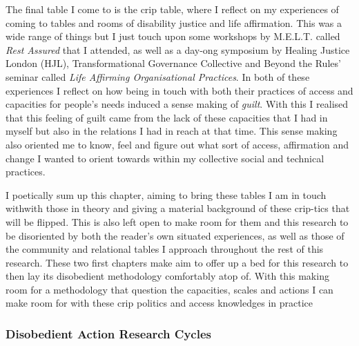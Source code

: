 The final table I come to is the crip table, where I reflect on my
experiences of coming to tables and rooms of disability justice and life
affirmation. This was a wide range of things but I just touch upon some
workshops by M.E.L.T. called \emph{Rest Assured} that I attended, as
well as a day-ong symposium by Healing Justice London (HJL),
Transformational Governance Collective and Beyond the Rules' seminar
called \emph{Life Affirming Organisational Practices}. In both of these
experiences I reflect on how being in touch with both their practices of
access and capacities for people's needs induced a sense making of
\emph{guilt}. With this I realised that this feeling of guilt came from
the lack of these capacities that I had in myself but also in the
relations I had in reach at that time. This sense making also oriented
me to know, feel and figure out what sort of access, affirmation and
change I wanted to orient towards within my collective social and
technical practices.

I poetically sum up this chapter, aiming to bring these tables I am in
touch withwith those in theory and giving a material background of these
crip-tics that will be flipped. This is also left open to make room for
them and this research to be disoriented by both the reader's own
situated experiences, as well as those of the community and relational
tables I approach throughout the rest of this research. These two first
chapters make aim to offer up a bed for this research to then lay its
disobedient methodology comfortably atop of. With this making room for a
methodology that question the capacities, scales and actions I can make
room for with these crip politics and access knowledges in practice

\hypertarget{disobedient-action-research-cycles}{%
\subsubsection[Disobedient Action Research
Cycles]{\texorpdfstring{\protect\hypertarget{anchor}{}{}Disobedient
Action Research
Cycles}{Disobedient Action Research Cycles}}\label{disobedient-action-research-cycles}}


